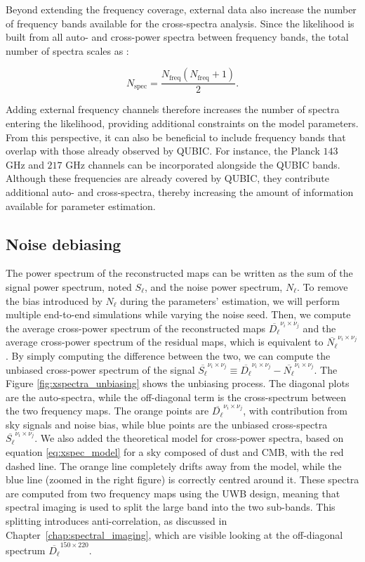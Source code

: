\documentclass[../../thesis.tex]{subfiles}
\begin{document}
Beyond extending the frequency coverage, external data also increase the number of frequency bands available for the cross-spectra analysis. Since the likelihood is built from all auto- and cross-power spectra between frequency bands, the total number of spectra scales as :

\begin{equation}
    N_{\mathrm{spec}} = \frac{N_{\mathrm{freq}}\left(N_{\mathrm{freq}}+1\right)}{2}.
\end{equation}

Adding external frequency channels therefore increases the number of spectra entering the likelihood, providing additional constraints on the model parameters. From this perspective, it can also be beneficial to include frequency bands that overlap with those already observed by QUBIC. For instance, the Planck $143$ GHz and $217$ GHz channels can be incorporated alongside the QUBIC bands. Although these frequencies are already covered by QUBIC, they contribute additional auto- and cross-spectra, thereby increasing the amount of information available for parameter estimation.

\subsection{Noise debiasing}

The power spectrum of the reconstructed maps can be written as the sum of the signal power spectrum, noted $S_\ell$, and the noise power spectrum, $N_\ell$. To remove the bias introduced by $N_\ell$ during the parameters' estimation, we will perform multiple end-to-end simulations while varying the noise seed. 
Then, we compute the average cross-power spectrum of the reconstructed maps $\overline{D_\ell}^{\nu_i \times \nu_j}$ and the average cross-power spectrum of the residual maps, which is equivalent to $\overline{N_\ell}^{\nu_i \times \nu_j}$. By simply computing the difference between the two, we can compute the unbiased cross-power spectrum of the signal $\overline{S_\ell}^{\nu_i \times \nu_j} \equiv \overline{D_\ell}^{\nu_i \times \nu_j} - \overline{N_\ell}^{\nu_i \times \nu_j}$. The Figure \ref{fig:xspectra_unbiasing} shows the unbiasing process. The diagonal plots are the auto-spectra, while the off-diagonal term is the cross-spectrum between the two frequency maps. The orange points are $\overline{D_\ell}^{\nu_i \times \nu_j}$, with contribution from sky signals and noise bias, while blue points are the unbiased cross-spectra $\overline{S_\ell}^{\nu_i \times \nu_j}$. We also added the theoretical model for cross-power spectra, based on equation \ref{eq:xspec_model} for a sky composed of dust and CMB, with the red dashed line. The orange line completely drifts away from the model, while the blue line (zoomed in the right figure) is correctly centred around it. These spectra are computed from two frequency maps using the UWB design, meaning that spectral imaging is used to split the large band into the two sub-bands. This splitting introduces anti-correlation, as discussed in Chapter~\ref{chap:spectral_imaging}, which are visible looking at the off-diagonal spectrum $\overline{D_\ell}^{150 \times 220}$.
\end{document}
